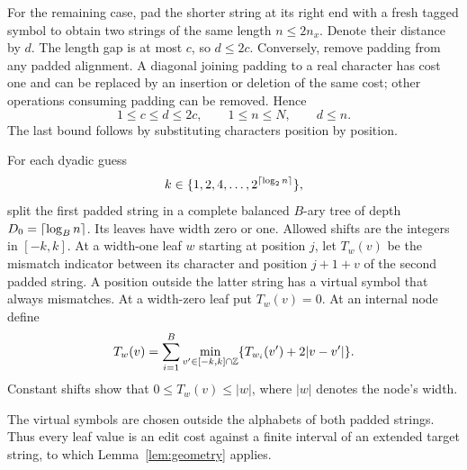 For the remaining case, pad the shorter string at its right end with a fresh
tagged symbol to obtain two strings of the same length $n\le2n_x$.  Denote their
distance by $d$.  The length gap is at most $c$, so $d\le2c$.  Conversely,
remove padding from any padded alignment.  A diagonal joining padding to a
real character has cost one and can be replaced by an insertion or deletion
of the same cost; other operations consuming padding can be removed.  Hence
\begin{equation}\label{eq:padding-comparison}
 1\le c\le d\le2c,\qquad 1\le n\le N,\qquad d\le n.
\end{equation}
The last bound follows by substituting characters position by position.

For each dyadic guess
\[
 k\in\{1,2,4,\ldots,2^{\lceil\log_2 n\rceil}\},
\]
split the first padded string in a complete balanced $B$-ary tree of depth
$D_0=\lceil\log_B n\rceil$.  Its leaves have width zero or one.  Allowed shifts are
the integers in $[-k,k]$.  At a width-one leaf $w$ starting at position $j$,
let $T_w(v)$ be the mismatch indicator between its character and position
$j+1+v$ of the second padded string.  A position outside the latter string
has a virtual symbol that always mismatches.  At a width-zero leaf put
$T_w(v)=0$.  At an internal node define
\begin{equation}\label{eq:coarse-tree}
 T_w(v)=\sum_{i=1}^B\min_{v'\in[-k,k]\cap\mathbb Z}
       \{T_{w_i}(v')+2|v-v'|\}.
\end{equation}
Constant shifts show that $0\le T_w(v)\le |w|$, where $|w|$ denotes the node's
width.

The virtual symbols are chosen outside the alphabets of both padded
strings. Thus every leaf value is an edit cost against a finite interval
of an extended target string, to which Lemma~\ref{lem:geometry} applies.


